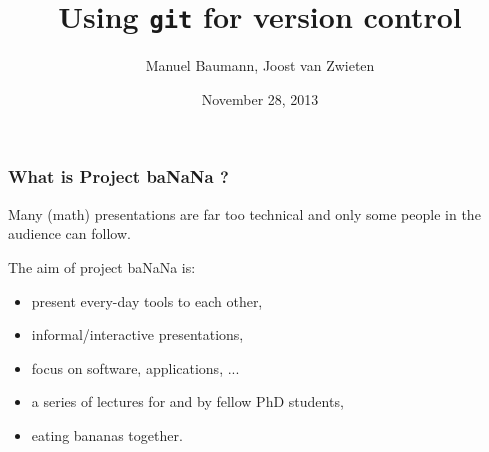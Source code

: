 \documentclass{beamer}
\title{\huge{Using \texttt{git} for version control}}
\author{Manuel Baumann, Joost van Zwieten}
\date{\footnotesize{November 28, 2013}}
\begin{document}
\frame{\titlepage}
\begin{frame}
\frametitle{What is Project baNaNa ?}
Many (math) presentations are far too technical and only some people in the audience can follow.

The aim of project ba\color{red}NaN\color{black}a is:
\begin{itemize}
 \item present every-day tools to each other,
 \pause
 \item informal/interactive presentations,
 \pause
 \item focus on software, applications, ...
 \pause
 \item a series of lectures for and by fellow PhD students,
 \pause
 \item eating bananas together.
\end{itemize}
\end{frame}
\end{document}
